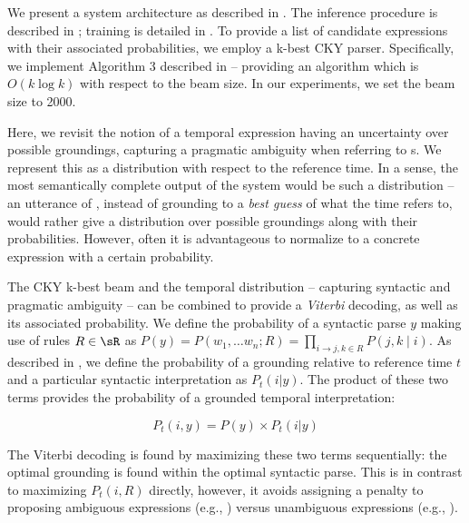 We present a system architecture as described in .
The inference procedure is described in ;
	training is detailed in .
To provide a list of
	candidate expressions with their associated probabilities, we
	employ a k-best CKY parser.
Specifically, we implement Algorithm 3 described in 
	 -- providing an algorithm which is
	$O(k\log k)$ with respect to the beam size.
In our experiments, we set the beam size to 2000.

Here, we revisit the notion of a temporal expression having an uncertainty
	over possible groundings, capturing a pragmatic ambiguity when
	referring to s.
We represent this as a distribution with respect to the reference time.
In a sense, the most semantically complete output of the system would be
	such a distribution -- 
	an utterance of , instead of grounding to a 
	\textit{best guess} of what the time refers to, would rather give a 
	distribution over possible groundings along with their probabilities.
However, often it is advantageous to normalize to a concrete expression with a
	certain probability.

The CKY k-best beam and the temporal distribution 
	-- capturing syntactic and pragmatic ambiguity --
	can be combined to provide a \textit{Viterbi} decoding, as well as
	its associated probability.
We define the probability of a syntactic parse $y$ making use of rules $R \in \sR$ 
	as $P(y) = P(w_1,\dots w_n; R) = \prod_{i \rightarrow j,k \in R}P(j,k \mid i)$.
	As described in , we define the probability of a 
	grounding relative to reference time $t$ and a particular
	syntactic interpretation as $P_t(i | y)$.
The product of these two terms provides the probability of a grounded temporal
	interpretation:

\begin{equation}
	P_t(i, y) = 
		P( y ) \times P_t(i | y)
\label{eqn:prob}
\end{equation}

The Viterbi decoding is found by maximizing these two terms sequentially:
	the optimal grounding is found within the optimal syntactic parse.
This is in contrast to maximizing $P_t(i,R)$ directly, however, it avoids
	assigning a penalty to proposing ambiguous expressions (e.g., )
	versus unambiguous expressions (e.g., ).

